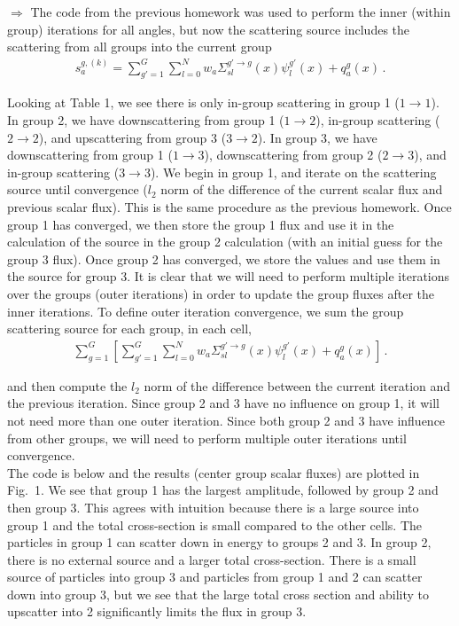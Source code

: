 \documentclass[10pt]{article}
\begin{document}
$\Rightarrow$ The code from the previous homework was used to perform the inner (within group) iterations for all angles, but now the scattering source includes the scattering from all groups into the current group
%
\begin{align*}
	s_a^{g,(k)} = \sum_{g'=1}^G \sum_{l=0}^N w_a \Sigma_{sl}^{g'\rightarrow g}(x) \psi_l^{g'}(x) + q_a^g(x)\,.
\end{align*}

Looking at Table 1, we see there is only in-group scattering in group 1 ($1\rightarrow1$). In group 2, we have downscattering from group 1 ($1\rightarrow2$), in-group scattering ($2\rightarrow2$), and upscattering from group 3 ($3\rightarrow2$). In group 3, we have downscattering from group 1 ($1\rightarrow3$), downscattering from group 2 ($2\rightarrow3$), and in-group scattering ($3\rightarrow3$). We begin in group 1, and iterate on the scattering source until convergence ($l_2$ norm of the difference of the current scalar flux and previous scalar flux). This is the same procedure as the previous homework. Once group 1 has converged, we then store the group 1 flux and use it in the calculation of the source in the group 2 calculation (with an initial guess for the group 3 flux). Once group 2 has converged, we store the values and use them in the source for group 3. It is clear that we will need to perform multiple iterations over the groups (outer iterations) in order to update the group fluxes after the inner iterations. To define outer iteration convergence, we sum the group scattering source for each group, in each cell, 
%
\begin{align*}
	\sum_{g=1}^G \left[ \sum_{g'=1}^G \sum_{l=0}^N w_a \Sigma_{sl}^{g'\rightarrow g}(x) \psi_l^{g'}(x) + q_a^g(x) \right] \,.
\end{align*}

and then compute the $l_2$ norm of the difference between the current iteration and the previous iteration. Since group 2 and 3 have no influence on group 1, it will not need more than one outer iteration. Since both group 2 and 3 have influence from other groups, we will need to perform multiple outer iterations until convergence. \\

The code is below and the results (center group scalar fluxes) are plotted in Fig.~1. We see that group 1 has the largest amplitude, followed by group 2 and then group 3. This agrees with intuition because there is a large source into group 1 and the total cross-section is small compared to the other cells. The particles in group 1 can scatter down in energy to groups 2 and 3. In group 2, there is no external source and a larger total cross-section. There is a small source of particles into group 3 and particles from group 1 and 2 can scatter down into group 3, but we see that the large total cross section and ability to upscatter into 2 significantly limits the flux in group 3.
\end{document}
